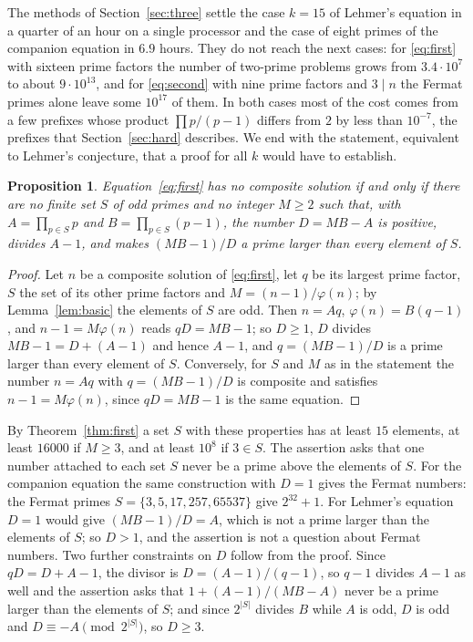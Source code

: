 \documentclass[11pt,reqno]{amsart}
\numberwithin{equation}{section}
\theoremstyle{plain}
\newtheorem{proposition}[theorem]{Proposition}
\theoremstyle{definition}
\theoremstyle{remark}
\begin{document}
The methods of Section~\ref{sec:three} settle the case $k=15$ of
Lehmer's equation in a quarter of an hour on a single processor and
the case of eight primes of the companion equation in $6.9$ hours.
They do not reach the next cases: for \eqref{eq:first} with sixteen
prime factors the number of two-prime problems grows from
$3.4\cdot10^7$ to about $9\cdot10^{13}$, and for \eqref{eq:second}
with nine prime factors and $3\mid n$ the Fermat primes alone leave
some $10^{17}$ of them. In both cases most of the cost comes from a
few prefixes whose product $\prod p/(p-1)$ differs from $2$ by less
than $10^{-7}$, the prefixes that Section~\ref{sec:hard} describes.
We end with the statement, equivalent to Lehmer's conjecture, that a
proof for all $k$ would have to establish.

\begin{proposition}\label{prop:equiv}
Equation~\eqref{eq:first} has no composite solution if and only if
there are no finite set $S$ of odd primes and no integer $M\ge2$ such
that, with $A=\prod_{p\in S}p$ and $B=\prod_{p\in S}(p-1)$, the number
$D=MB-A$ is positive, divides $A-1$, and makes $(MB-1)/D$ a prime
larger than every element of $S$.
\end{proposition}

\begin{proof}
Let $n$ be a composite solution of \eqref{eq:first}, let $q$ be its
largest prime factor, $S$ the set of its other prime factors and
$M=(n-1)/\varphi(n)$; by Lemma~\ref{lem:basic} the elements of $S$
are odd. Then $n=Aq$, $\varphi(n)=B(q-1)$, and $n-1=M\varphi(n)$ reads
$qD=MB-1$; so $D\ge1$, $D$ divides $MB-1=D+(A-1)$ and hence $A-1$,
and $q=(MB-1)/D$ is a prime larger than every element of $S$.
Conversely, for $S$ and $M$ as in the statement the number $n=Aq$ with
$q=(MB-1)/D$ is composite and satisfies $n-1=M\varphi(n)$, since
$qD=MB-1$ is the same equation.
\end{proof}

By Theorem~\ref{thm:first} a set $S$ with these properties has at
least $15$ elements, at least $16000$ if $M\ge3$, and at least $10^8$
if $3\in S$. The assertion asks that one number attached to each set
$S$ never be a prime above the elements of $S$. For the companion
equation the same construction with $D=1$ gives the Fermat numbers:
the Fermat primes $S=\{3,5,17,257,65537\}$ give $2^{32}+1$. For
Lehmer's equation $D=1$ would give $(MB-1)/D=A$, which is not a prime
larger than the elements of $S$; so $D>1$, and the assertion is not a
question about Fermat numbers. Two further constraints on $D$ follow
from the proof. Since $qD=D+A-1$, the divisor is
$D=(A-1)/(q-1)$, so $q-1$ divides $A-1$ as well and the assertion asks
that $1+(A-1)/(MB-A)$ never be a prime larger than the elements of
$S$; and since $2^{|S|}$ divides $B$ while $A$ is odd, $D$ is odd and
$D\equiv-A\pmod{2^{|S|}}$, so $D\ge3$.
\end{document}
